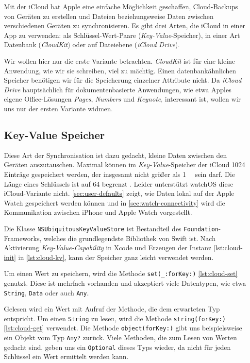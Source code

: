 Mit der iCloud hat Apple eine einfache Möglichkeit geschaffen, Cloud-Backups von Geräten zu erstellen und Dateien beziehungsweise Daten zwischen verschiedenen Geräten zu synchronisieren. Es gibt drei Arten, die iCloud in einer App zu verwenden: als Schlüssel-Wert-Paare (\emph{Key-Value}-Speicher), in einer Art Datenbank (\emph{CloudKit}) oder auf Dateiebene (\emph{iCloud Drive}).

Wir wollen hier nur die erste Variante betrachten. \emph{CloudKit} ist für eine kleine Anwendung, wie wir sie schreiben, viel zu mächtig. Einen datenbankähnlichen Speicher benötigen wir für die Speicherung einzelner Attribute nicht. Da \emph{iCloud Drive} hauptsächlich für dokumentenbasierte Anwendungen, wie etwa Apples eigene Office-Lösungen \emph{Pages}, \emph{Numbers} und \emph{Keynote}, interessant ist, wollen wir uns nur der ersten Variante widmen.

\subsection{Key-Value Speicher}

Diese Art der Synchronisation ist dazu gedacht, kleine Daten zwischen den Geräten auszutauschen. Maximal können im \emph{Key-Value}-Speicher der iCloud 1024 Einträge gespeichert werden, der insgesamt nicht größer als \SI{1}{\mega\byte} sein darf. Die Länge eines Schlüssels ist auf  \SI{64}{\byte} begrenzt \cite{Kofler:2019:Swift-5---Das-umfassende-Handbuch}. Leider unterstützt watchOS diese iCloud-Variante nicht. \autoref{sec:user-defaults} zeigt, wie Daten lokal auf der Apple Watch gespeichert werden können und in \autoref{sec:watch-connectivity} wird die Kommunikation zwischen iPhone und Apple Watch vorgestellt.

Die Klasse \texttt{NSUbiquitousKeyValueStore} ist Bestandteil des \texttt{Foundation}-Frameworks, welches die grundlegendste Bibliothek von Swift ist. Nach Aktivierung \emph{Key-Value-Capability} in Xcode und Erzeugen der Instanz \ref*{lst:cloud-init} in \autoref{lst:cloud-kv}, kann der Speicher ganz leicht verwendet werden.

Um einen Wert zu speichern, wird die Methode \texttt{set(\_:forKey:)} \ref*{lst:cloud-set} genutzt. Diese ist mehrfach vorhanden und akzeptiert viele Datentypen, wie etwa \texttt{String}, \texttt{Data} oder auch \texttt{Any}.

Gelesen wird ein Wert mit Aufruf der Methode, die dem erwarteten Typ entspricht. Um einen \texttt{String} zu lesen, wird die Methode \texttt{string(forKey:)} \ref*{lst:cloud-get} verwendet. Die Methode \texttt{object(forKey:)} gibt uns beispielsweise ein Objekt vom Typ \texttt{Any?} zurück. Viele Methoden, die zum Lesen von Werten gedacht sind, geben uns ein \texttt{Optional} dieses Typs wieder, da nicht für jeden Schlüssel ein Wert ermittelt werden kann.

